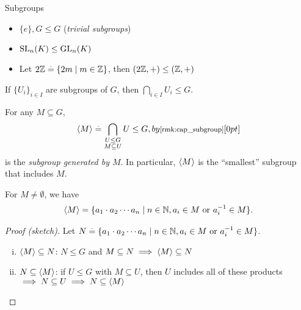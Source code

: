\begin{ex}{Subgroups}{}
\begin{itemize}
    \item $\{e\}, G \leq G$ (\emph{trivial subgroups})
    \item $\mathrm{SL}_{n}(K) \leq \mathrm{GL}_{n}(K)$
    \item Let $2\mathbb{Z} \overset{.}{=} \{2m \mid m \in \mathbb{Z}\}$, then $(2\mathbb{Z},+) \leq (\mathbb{Z},+)$
\end{itemize}
\end{ex}

\begin{rmk}\label{rmk:cap_subgroup}
If $\{U_i\}_{i \in I}$ are subgroups of $G$, then $\bigcap_{i \in I} U_i \leq G$.
\end{rmk}

\begin{defn}
For any $M \subseteq G$, \begin{align}
    \gen{M} \defeq \bigcap_{\substack{U \leq G \\ M \subseteq U}} U \leq G, \margintag{by \cref{rmk:cap_subgroup}}
\end{align} is the \emph{subgroup generated by $M$}. In particular, $\langle M \rangle$ is the ``smallest'' subgroup that includes $M$.
\end{defn}

\begin{lem}
For $M \neq \emptyset$, we have \begin{align}
    \langle M \rangle = \{a_1 \cdot a_2 \cdots a_n \mid n \in \mathbb{N}, \text{$a_i \in M$ or $a_i^{-1} \in M$}\}.
\end{align}
\end{lem} \begin{proof}[Proof (sketch)]\leavevmode
Let $N \overset{.}{=} \{a_1 \cdot a_2 \cdots a_n \mid n \in \mathbb{N}, \text{$a_i \in M$ or $a_i^{-1} \in M$}\}$.
\begin{enumerate}[(i),leftmargin=2\parindent]
    \item \underline{$\langle M \rangle \subseteq N$}: $N \leq G$ and $M \subseteq N \implies \langle M \rangle \subseteq N$ 
    \item \underline{$N \subseteq \langle M \rangle$}: if $U \leq G$ with $M \subseteq U$, then $U$ includes all of these products $\implies N \subseteq U \implies N \subseteq \langle M \rangle$ \qedhere
\end{enumerate}
\end{proof}

